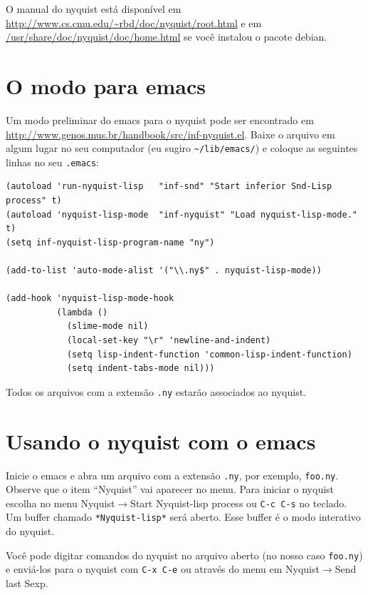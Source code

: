 \documentclass[12pt,brazil]{book}
\newcommand{\sep}{$\rightarrow$}
\begin{document}
O manual do nyquist está disponível em
\url{http://www.cs.cmu.edu/~rbd/doc/nyquist/root.html} e em
\url{/usr/share/doc/nyquist/doc/home.html} se você instalou o pacote
debian.

\section{O modo para emacs}
\label{sec:o-modo-para-2}

Um modo preliminar do emacs para o nyquist pode ser encontrado em
\url{http://www.genos.mus.br/handbook/src/inf-nyquist.el}. Baixe o arquivo em
algum lugar no seu computador (eu sugiro \verb|~/lib/emacs/|) e
coloque as seguintes linhas no seu \texttt{.emacs}:

\begin{verbatim}
(autoload 'run-nyquist-lisp   "inf-snd" "Start inferior Snd-Lisp process" t)
(autoload 'nyquist-lisp-mode  "inf-nyquist" "Load nyquist-lisp-mode." t)
(setq inf-nyquist-lisp-program-name "ny")

(add-to-list 'auto-mode-alist '("\\.ny$" . nyquist-lisp-mode))

(add-hook 'nyquist-lisp-mode-hook
          (lambda ()
            (slime-mode nil)
            (local-set-key "\r" 'newline-and-indent)
            (setq lisp-indent-function 'common-lisp-indent-function)
            (setq indent-tabs-mode nil)))
\end{verbatim}

Todos os arquivos com a extensão \texttt{.ny} estarão associados ao
nyquist.

\section{Usando o nyquist com o emacs}
\label{sec:usando-o-nyquist}

Inicie o emacs e abra um arquivo com a extensão \texttt{.ny}, por
exemplo, \texttt{foo.ny}. Observe que o item ``Nyquist'' vai aparecer
no menu. Para iniciar o nyquist escolha no menu Nyquist\sep Start
Nyquist-lisp process ou \texttt{C-c C-s} no teclado. Um buffer chamado
\texttt{*Nyquist-lisp*} será aberto. Esse buffer é o modo interativo
do nyquist.

Você pode digitar comandos do nyquist no arquivo aberto (no nosso caso
\texttt{foo.ny}) e enviá-los para o nyquist com \texttt{C-x C-e} ou
através do menu em Nyquist\sep Send last Sexp.
\end{document}
